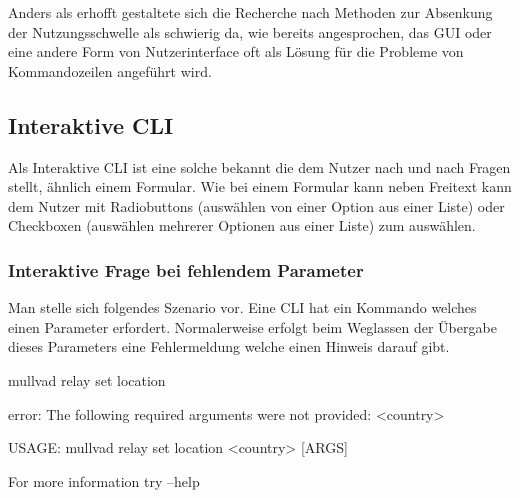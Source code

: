 \documentclass[oneside,bibliography=totocnumbered,BCOR=5mm]{scrbook}
\newenvironment{code}{\captionsetup{type=listing, skip=0pt}}{}
\begin{document}
\newcommand{\methbox}[2]{
  \fbox{\parbox{\linewidth}{
    \label{meth:#1}
    \textbf{Methode~\ref{meth:#1}}: #2
  }}
}
\newcommand{\methref}[1]{
  Methode~\ref{meth:#1}
}

Anders als erhofft gestaltete sich die Recherche nach Methoden zur Absenkung
der Nutzungsschwelle als schwierig da, wie bereits angesprochen, das GUI oder
eine andere Form von Nutzerinterface oft als Lösung für die Probleme von
Kommandozeilen angeführt wird.




\subsection{Interaktive CLI}

Als Interaktive CLI ist eine solche bekannt die dem Nutzer nach und nach Fragen
stellt, ähnlich einem Formular. Wie bei einem Formular kann neben Freitext kann
dem Nutzer mit Radiobuttons (auswählen von einer Option aus einer Liste) oder
Checkboxen (auswählen mehrerer Optionen aus einer Liste) zum auswählen. %



\subsubsection{Interaktive Frage bei fehlendem Parameter}

Man stelle sich folgendes Szenario vor. Eine CLI hat ein Kommando welches einen Parameter erfordert.
Normalerweise erfolgt beim Weglassen der Übergabe dieses Parameters eine Fehlermeldung welche einen Hinweis darauf gibt.

\begin{code}
  \begin{shellcode}
mullvad relay set location

error: The following required arguments were not provided:
    <country>

USAGE:
    mullvad relay set location <country> [ARGS]

For more information try --help
  \end{shellcode}
  \medskip
\end{code}
\end{document}
